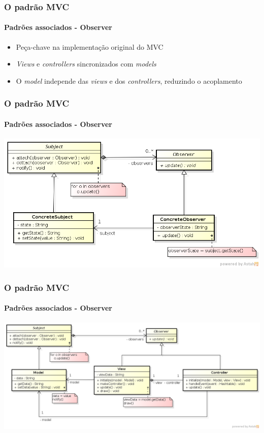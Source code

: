 \documentclass{beamer}
\begin{document}
\begin{frame}
\frametitle{O padrão MVC}
\framesubtitle{Padrões associados - Observer}
\begin{itemize}
  \item {Peça-chave na implementação original do MVC}
  \item {\textit{Views} e \textit{controllers} sincronizados com \textit{models}}
  \item {O \textit{model} independe das \textit{views} e dos \textit{controllers}, reduzindo o acoplamento}
\end{itemize}
\end{frame}

\begin{frame}
\frametitle{O padrão MVC}
\framesubtitle{Padrões associados - Observer}
	\begin{center}
		\includegraphics[scale=0.45]{Observer.png}
	\end{center}
\end{frame}

\begin{frame}
\frametitle{O padrão MVC}
\framesubtitle{Padrões associados - Observer}
\begin{center}
    \hspace{-1cm}
		\includegraphics[scale=0.32]{ClassicMVC.png}
	\end{center}
\end{frame}
\end{document}
